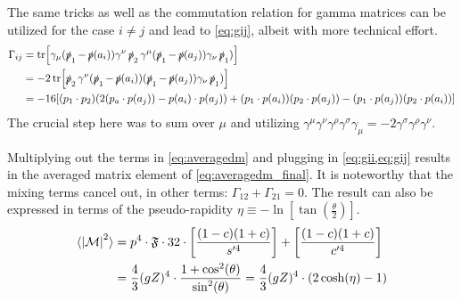%
The same tricks as well as the commutation relation for gamma matrices
can be utilized for the case \(i\neq j\) and lead to \cref{eq:gij},
albeit with more technical effort.
%
\begin{equation}
  \label{eq:gij}
  \begin{split}
\Gamma_{ij} &=
\tr[\gamma_\mu(\operatorname{\slashed{p}}_1-\operatorname{\slashed{p}}(a_i))\gamma^\nu\operatorname{\slashed{p}}_2\gamma^\mu(\operatorname{\slashed{p}}_1-\operatorname{\slashed{p}}(a_j))\gamma_\nu\operatorname{\slashed{p}}_1)]\\
&= -2\tr[\operatorname{\slashed{p}}_2\gamma^\nu(\operatorname{\slashed{p}}_1-\operatorname{\slashed{p}}(a_i))(\operatorname{\slashed{p}}_1-\operatorname{\slashed{p}}(a_j))\gamma_\nu\operatorname{\slashed{p}}_1)]
   \\
&=-16\qty[(p_1\cdot p_2)(2(p_a\cdot p(a_j)) - p(a_i)\cdot p(a_j)) +
(p_1\cdot p(a_i))(p_2\cdot p(a_j)) - (p_1\cdot p(a_j))(p_2\cdot p(a_i))]
\end{split}
\end{equation}
%
The crucial step here was to sum over \(\mu\) and utilizing
\(\gamma ^{\mu }\gamma ^{\nu }\gamma ^{\rho }\gamma ^{\sigma }\gamma
_{\mu }=-2\gamma ^{\sigma }\gamma ^{\rho }\gamma ^{\nu }\).

Multiplying out the terms in \cref{eq:averagedm} and plugging in
\cref{eq:gii,eq:gij} results in the averaged matrix element of
\cref{eq:averagedm_final}. It is noteworthy that the mixing terms
cancel out, in other terms: \(\Gamma_{12} + \Gamma_{21} = 0\). The
result can also be expressed in terms of the pseudo-rapidity
\(\eta \equiv -\ln[\tan(\frac{\theta}{2})]\).
%
\begin{equation}
  \label{eq:averagedm_final}
  \begin{split}
  \langle\abs{\mathcal{M}}^2\rangle &= p^4\cdot\mathfrak{F}\cdot
  32\cdot\qty[\frac{(1-c)(1+c)}{s'^4}] + \qty[\frac{(1-c)(1+c)}{c'^4}] \\
  &= \frac{4}{3}(gZ)^4 \cdot\frac{1+\cos^2(\theta)}{\sin^2(\theta)} =
  \frac{4}{3}(gZ)^4\cdot(2\cosh(\eta) - 1)
  \end{split}
\end{equation}
%
